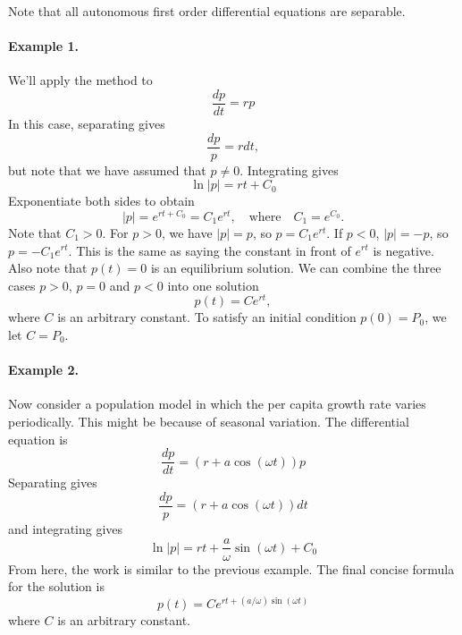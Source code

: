 \documentclass[reqno]{immbook}
\begin{document}
Note that all autonomous first order differential equations are separable.

\paragraph{Example 1.}
We'll apply the method to
\begin{equation}
   \frac{dp}{dt} = r p
\end{equation}
In this case, separating gives
\begin{equation}
   \frac{dp}{p} = r dt,
\end{equation}
but note that we have assumed that $p\ne 0$.
Integrating gives
\begin{equation}
   \ln | p | = rt+C_0
\end{equation}
Exponentiate both sides to obtain
\begin{equation}
  |p| = e^{rt+C_0} = C_1e^{rt}, \quad \textrm{where} \quad C_1 = e^{C_0}.
\end{equation}
Note that $C_1 > 0$.
For $p > 0$, we have $|p|=p$, so $p=C_1e^{rt}$.
If $p < 0$, $|p| = -p$, so $p = -C_1e^{rt}$.
This is the same as saying the constant in front of $e^{rt}$ is negative.
Also note that $p(t)=0$ is an equilibrium solution.
We can combine the three cases $p>0$, $p=0$ and $p<0$ into one
solution
\begin{equation}
   p(t) = Ce^{rt},
\end{equation}
where $C$ is an arbitrary constant.
To satisfy an initial condition $p(0)=P_0$, we let $C=P_0$.

\paragraph{Example 2.}
Now consider a population model in which the per capita growth
rate varies periodically.  This might be because of seasonal variation.
The differential equation is
\begin{equation}
   \frac{dp}{dt} = (r + a\cos(\omega t))p
\end{equation}
Separating gives
\begin{equation}
  \frac{dp}{p} = \left( r+a\cos(\omega t) \right) dt
\end{equation}
and integrating gives
\begin{equation}
  \ln | p | = rt + \frac{a}{\omega} \sin(\omega t) + C_0
\end{equation}
From here, the work is similar to the previous example.
The final concise formula for the solution is
\begin{equation}
   p(t) = Ce^{rt + (a/\omega)\sin(\omega t)}
\end{equation}
where $C$ is an arbitrary constant.
%
%
\end{document}
